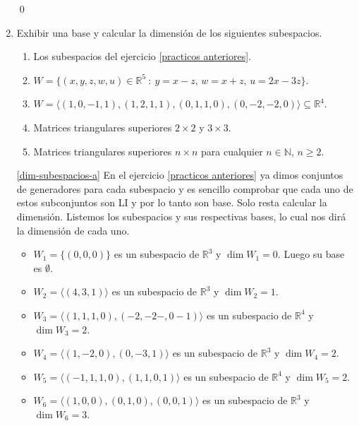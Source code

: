 \begin{enumerate}[resume, topsep=6pt, itemsep=.4cm]
    \qed     
    
    \item  Exhibir una base y calcular la dimensión de los siguientes subespacios.
    \begin{enumerate}
        \item\label{dim-subespacios-a} Los subespacios del ejercicio \ref{practicos anteriores}.
        \item\label{dim-subespacios-b} $W = \{(x,y,z,w,u) \in \mathbb{R}^5 \ : \ y = x - z,\, w = x + z,\,  u = 2x - 3z \}$.
        \item\label{dim-subespacios-c} $W = \langle (1, 0, -1, 1),  (1, 2, 1, 1), (0, 1, 1, 0), (0, -2, -2, 0) \rangle \subseteq \mathbb R^4$.
        \item\label{dim-subespacios-d} Matrices triangulares superiores $2\times 2$ y $3\times 3$.
        \item\label{dim-subespacios-e} Matrices triangulares superiores $n\times n$ para cualquier $n\in\mathbb{N}$, $n\geq 2$.
    \end{enumerate}
    
    \rta 

    \ref{dim-subespacios-a} En  el ejercicio \ref{practicos anteriores} ya dimos conjuntos de generadores para cada subespacio y es sencillo comprobar que cada uno  de estos subconjuntos son LI y por lo tanto son base. Solo resta calcular la dimensión. Listemos los subespacios y sus respectivas bases, lo cual nos dirá la dimensión de cada uno.
    \begin{itemize}
        \item $W_1= \{(0,0,0)\}$ es un subespacio de $\mathbb{R}^3$ y $\dim W_1=0$. Luego  su base es $\emptyset$.
        \item $W_2=\langle (4,3,1)\rangle$ es un subespacio de $\mathbb{R}^3$ y $\dim W_2=1$.
        \item $W_3=\langle (1,1,1,0),(-2,-2-,0-1)\rangle$ es un subespacio de $\mathbb{R}^4$ y $\dim W_3=2$.
        \item $W_4=\langle (1,-2,0),(0,-3,1)\rangle$ es un subespacio de $\mathbb{R}^3$ y $\dim W_4=2$.
        \item $W_5 = \langle (-1, 1, 1, 0), (1, 1, 0, 1) \rangle$ es un subespacio de $\mathbb{R}^4$ y $\dim W_5=2$.
        \item $W_6 = \langle (1, 0, 0), (0, 1, 0), (0,0,1) \rangle$ es un subespacio de $\mathbb{R}^3$ y $\dim W_6=3$.
    \end{itemize}


\end{enumerate}
